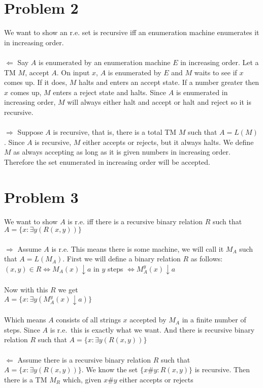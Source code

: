 \documentclass[12pt]{article}
\begin{document}
\section*{Problem 2}
We want to show an r.e. set is recursive iff an enumeration machine enumerates 
it in increasing order.\\
\\
$\Leftarrow$ Say $A$ is enumerated by an enumeration machine $E$ in increasing
order. Let a TM $M$, accept $A$. On input $x$, $A$ is enumerated by $E$ and $M$
waits to see if $x$ comes up. If it does, $M$ halts and enters an accept state. If
a number greater then $x$ comes up, $M$ enters a reject state and halts. Since $A$
is enumerated in increasing order, $M$ will always either halt and accept or halt
and reject so it is recursive.\\
\\
$\Rightarrow$ Suppose $A$ is recursive, that is, there is a total TM $M$ such that 
$A = L(M)$. Since $A$ is recursive, $M$ either accepts or rejects, but it always
halts. We define $M$ as always accepting as long as it is given numbers in
increasing order. Therefore the set enumerated in increasing order will be 
accepted.\\


\section*{Problem 3}
We want to show $A$ is r.e. iff there is a recursive binary relation $R$ such that 
$A = \{x : \exists y (R(x,y))\}$\\
\\
$\Rightarrow$ Assume $A$ is r.e. This means there is some machine, we will call it
$M_A$ such that $A = L(M_A)$. First we will define a binary relation $R$ as follows:\\

$(x,y) \in R \iff M_A(x) \downarrow a$ in $y$ steps $\iff M_A^y(x) \downarrow a$\\
\\
Now with this $R$ we get\\

$A = \{x : \exists y (M^y_A(x) \downarrow a)\}$\\
\\
Which means $A$ consists of all strings $x$ accepted by $M_A$ in a finite number of
steps. Since $A$ is r.e.\ this is exactly what we want. And there is recursive
binary relation $R$ such that $A = \{x : \exists y (R(x,y))\}$\\
\\
$\Leftarrow$ Assume there is a recursive binary relation $R$ such that 
$A = \{x : \exists y (R(x,y)) \}$. We know the set $\{x\#y : R(x,y)\}$ is recursive.
Then there is a TM $M_R$ which, given $x\#y$ either accepts or rejects\\
\end{document}
